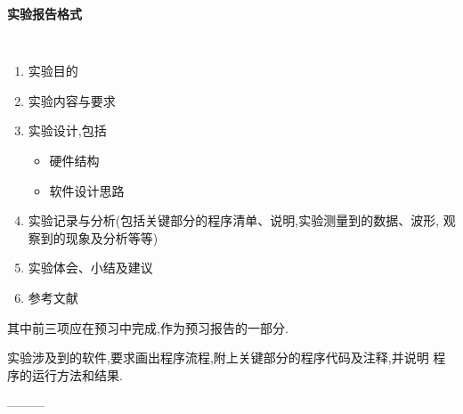 \setcounter{chapter}{0}
\begin{center} \LARGE \bf \textsf{实验报告格式} \end{center}
\large \tt
\begin{enumerate}\itemsep=-3pt
  \item 实验目的
  \item 实验内容与要求
  \item 实验设计,包括
  \begin{itemize}
    \item 硬件结构
    \item 软件设计思路
  \end{itemize}
  \item 实验记录与分析(包括关键部分的程序清单、说明,实验测量到的数据、波形,
        观察到的现象及分析等等)
  \item 实验体会、小结及建议
  \item 参考文献
\end{enumerate}
其中前三项应在预习中完成,作为预习报告的一部分.

    实验涉及到的软件,要求画出程序流程,附上关键部分的程序代码及注释,并说明
程序的运行方法和结果.

\begin{center} --------- \end{center}
\iffalse

    *实验提倡独立思考,鼓励创新钻研.教师在指导实验中可适当地配以示教,但不
提倡简单的``有问必答''.
  
    *学生实验结束,须经教师检查签字认可,并及时书写实验报告.实验报告应以原始
记录为依据,可在预习报告的基础上,增添整理实验纪录和分析、实验体会与小结.
实验报告应及时完成.
\fi
\rm\normalsize
